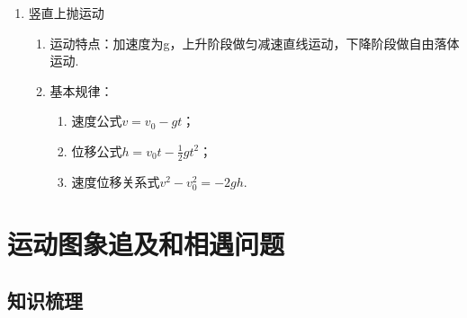 \documentclass[cn,11pt]{elegantbook}
\begin{document}
\begin{enumerate}
\begin{enumerate}
\begin{enumerate}
         \end{enumerate}
      \end{enumerate}
      \item 竖直上抛运动
      \begin{enumerate}
         \item 运动特点：加速度为g，上升阶段做匀减速直线运动，下降阶段做自由落体运动.
         \item 基本规律：
         \begin{enumerate}
            \item 速度公式$v=v_{0}-g t$；
            \item 位移公式$h=v_{0} t-\frac{1}{2} g t^{2}$；
            \item 速度位移关系式$v^{2}-v_{0}^{2}=-2 g h$.
         \end{enumerate}
      \end{enumerate}
   \end{enumerate}

   \section{运动图象追及和相遇问题}
   \subsection{知识梳理}
\end{document}
